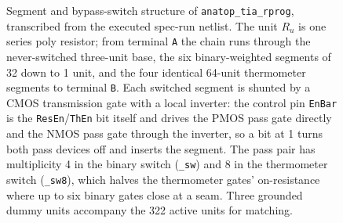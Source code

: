 \begin{figure}[htbp]
{\begin{circuitikz}
\end{circuitikz}
  }
  \caption[{Segment and bypass-switch structure of the programmable feedback
  resistor \texttt{anatop\_tia\_rprog}.}]{Segment and bypass-switch structure of
  \texttt{anatop\_tia\_rprog}, transcribed from the executed spec-run netlist.
  The unit \(R_u\) is one series poly resistor; from terminal \texttt{A} the
  chain runs through the never-switched three-unit base, the six binary-weighted
  segments of 32 down to 1 unit, and the four identical 64-unit thermometer
  segments to terminal \texttt{B}. Each switched segment is shunted by a CMOS
  transmission gate with a local inverter: the control pin \texttt{EnBar} is
  the \texttt{ResEn}/\texttt{ThEn} bit itself and drives the PMOS pass gate
  directly and the NMOS pass gate through the inverter, so a bit at 1 turns
  both pass devices off and inserts the segment. The pass pair has
  multiplicity 4 in the binary switch (\texttt{\_sw}) and 8 in the thermometer
  switch (\texttt{\_sw8}), which halves the thermometer gates' on-resistance
  where up to six binary gates close at a seam. Three grounded dummy units
  accompany the 322 active units for matching.}
  \label{fig:tiarprog-switch}
\end{figure}
